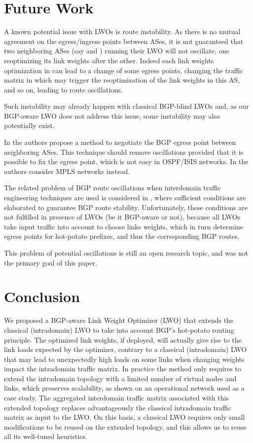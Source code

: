 \documentclass{acm_proc_article-sp}
\begin{document}
\section{Future Work}
\label{sec:extensions}

A known potential issue with LWOs is route instability. As there is no mutual agreement
on the egress/ingress points between ASes, it is not guaranteed that
two neighboring ASes (say  and ) running their LWO will not oscillate,
one reoptimizing its link weights after the other. Indeed each link weights
optimization in  can lead to a change of some egress points, changing
the traffic matrix in  which may trigger the reoptimization of
the link weights in this AS, and so on, leading to route oscillations.

Such instability may already happen with classical BGP-blind LWOs and, as our BGP-aware
LWO does not address this issue, some instability may also potentially exist.

In \cite{mahajan2005} the authors propose a method to negotiate
the BGP egress point between neighboring ASes. This technique should
remove oscillations provided that it is possible to fix the egress point,
which is not easy in OSPF/ISIS networks. In \cite{mahajan2005} the
authors consider MPLS networks instead.

The related problem of BGP route oscillations when interdomain traffic
engineering techniques are used is considered in
\cite{yang05}, where sufficient conditions are elaborated to guarantee BGP route stability.
Unfortunately, these conditions are not fulfilled in presence of LWOs (be it BGP-aware or not),
because all LWOs take input traffic into account to choose links weights, which in turn
determine egress points for hot-potato prefixes, and thus the corresponding BGP routes.

This problem of potential oscillations is still an open research
topic, and was not the primary goal of this paper.



\section{Conclusion}
\label{sec:conclusion}

We proposed a BGP-aware Link Weight Optimizer (LWO) 
that extends the 
classical (intradomain) LWO to take into account BGP's hot-potato routing principle. 
The optimized link weights, if deployed, will actually give rise to the 
link loads expected by the optimizer, contrary to a classical (intradomain) 
LWO that may lead to unexpectedly high loads on some links when changing 
weights impact the intradomain traffic matrix.
In practice the method only requires to extend the intradomain topology 
with a limited number of virtual nodes and links, which preserves scalability, 
as shown on an operational network used as a case study. The aggregated interdomain
traffic matrix associated with this extended topology 
replaces advantageously the classical intradomain traffic matrix as input to the
LWO.
On this basis, a classical LWO requires only small modifications to be reused on the extended topology, 
and this allows us to reuse all its well-tuned heuristics.
\end{document}
